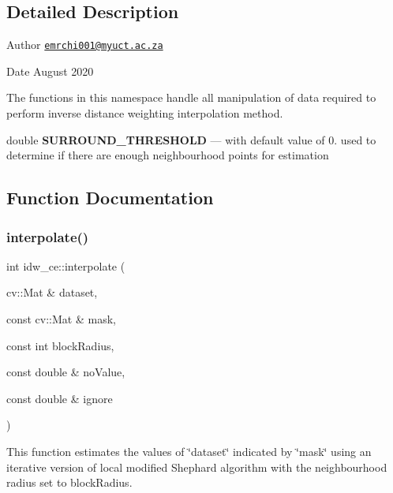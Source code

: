 \subsection{Detailed Description}
\begin{DoxyAuthor}{Author}
\href{mailto:emrchi001@myuct.ac.za}{\tt emrchi001@myuct.\+ac.\+za} 
\end{DoxyAuthor}
\begin{DoxyDate}{Date}
August 2020 ~\newline

\end{DoxyDate}
The functions in this namespace handle all manipulation of data required to perform inverse distance weighting interpolation method.

\label{namespaceidw__ce_THRESHOLD}%
%
double {\bfseries S\+U\+R\+R\+O\+U\+N\+D\+\_\+\+T\+H\+R\+E\+S\+H\+O\+LD} --- with default value of 0. used to determine if there are enough neighbourhood points for estimation 

\subsection{Function Documentation}
\mbox{\label{namespaceidw__ce_af1a4c1755f98b117f835169d021e5086}} 
\subsubsection{\texorpdfstring{interpolate()}{interpolate()}}
{\footnotesize\ttfamily int idw\+\_\+ce\+::interpolate (\begin{DoxyParamCaption}\item[{cv\+::\+Mat \&}]{dataset,  }\item[{const cv\+::\+Mat \&}]{mask,  }\item[{const int}]{block\+Radius,  }\item[{const double \&}]{no\+Value,  }\item[{const double \&}]{ignore }\end{DoxyParamCaption})}



This function estimates the values of \char`\"{}dataset\char`\"{} indicated by \char`\"{}mask\char`\"{} using an iterative version of local modified Shephard algorithm with the neighbourhood radius set to block\+Radius. 

